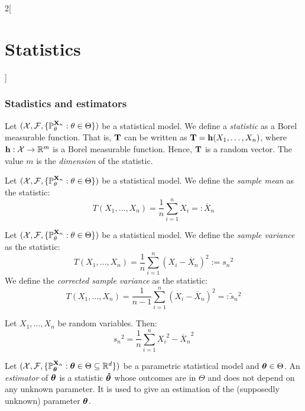 \documentclass[../../../main.tex]{subfiles}
\begin{document}
\begin{multicols}{2}[\section{Statistics}]
  \subsubsection{Stadistics and estimators}
  \begin{definition}[Statistic]
    Let $(\mathcal{X},\mathcal{F},\{\mathbb{P}_\theta^{\boldsymbol{\mathrm{X}}_n}:\theta\in\Theta\})$ be a statistical model. We define a \emph{statistic} as a Borel measurable function. That is, $\boldsymbol{\mathrm{T}}$ can be written as $\boldsymbol{\mathrm{T}}=\boldsymbol{\mathrm{h}}(X_1,\ldots,X_n)$, where $\boldsymbol{\mathrm{h}}:\mathcal{X}\rightarrow\mathbb{R}^m$ is a Borel measurable function. Hence, $\boldsymbol{\mathrm{T}}$ is a random vector. The value $m$ is the \emph{dimension} of the statistic.
  \end{definition}
  \begin{definition}
    Let $(\mathcal{X},\mathcal{F},\{\mathbb{P}_\theta^{\boldsymbol{\mathrm{X}}_n}:\theta\in\Theta\})$ be a statistical model. We define the \emph{sample mean} as the statistic: $$T(X_1,\ldots,X_n)=\frac{1}{n}\sum_{i=1}^nX_i=:\overline{X}_n$$
  \end{definition}
  \begin{definition}
    Let $(\mathcal{X},\mathcal{F},\{\mathbb{P}_\theta^{\boldsymbol{\mathrm{X}}_n}:\theta\in\Theta\})$ be a statistical model. We define the \emph{sample variance} as the statistic: $$T(X_1,\ldots,X_n)=\frac{1}{n}\sum_{i=1}^n{(X_i-\overline{X}_n)}^2:={s_n}^2$$ We define the \emph{corrected sample variance} as the statistic:
    $$T(X_1,\ldots,X_n)=\frac{1}{n-1}\sum_{i=1}^n{(X_i-\overline{X}_n)}^2=:\tilde{s}_n{}^2$$
  \end{definition}
  \begin{proposition}
    Let $X_1,\ldots,X_n$ be random variables. Then: $${s_n}^2=\frac{1}{n}\sum_{i=1}^n{X_i}^2-{\overline{X}_n}^2$$
  \end{proposition}
  \begin{definition}
    Let $(\mathcal{X},\mathcal{F},\{\mathbb{P}_{\boldsymbol{\mathrm{\theta}}}^{\boldsymbol{\mathrm{X}}_n}:\boldsymbol{\mathrm{\theta}}\in\Theta\subseteq \mathbb{R}^d\})$ be a parametric statistical model and $\boldsymbol{\mathrm{\theta}} \in\Theta$. An \emph{estimator} of $\boldsymbol{\mathrm{\theta}}$ is a statistic $\boldsymbol{\mathrm{\hat\theta}}$ whose outcomes are in $\Theta$ and does not depend on any unknown parameter. It is used to give an estimation of the (supposedly unknown) parameter $\boldsymbol{\mathrm{\theta}}$.
  \end{definition}

\end{multicols}
\end{document}
